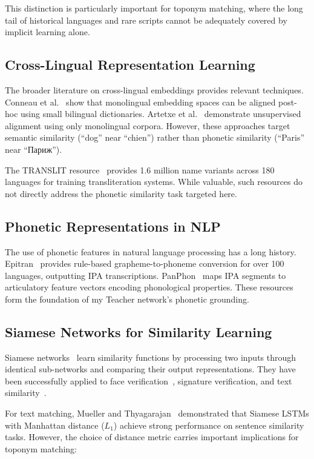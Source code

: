 \documentclass[11pt,a4paper]{article}
\begin{document}
This distinction is particularly important for toponym matching, where the long tail of historical languages and rare scripts cannot be adequately covered by implicit learning alone.

\subsection{Cross-Lingual Representation Learning}

The broader literature on cross-lingual embeddings provides relevant techniques. Conneau et al.~\citep{conneau2018} show that monolingual embedding spaces can be aligned post-hoc using small bilingual dictionaries. Artetxe et al.~\citep{artetxe2018} demonstrate unsupervised alignment using only monolingual corpora. However, these approaches target semantic similarity (``dog'' near ``chien'') rather than phonetic similarity (``Paris'' near ``Париж'').

The TRANSLIT resource~\citep{translit2020} provides 1.6 million name variants across 180 languages for training transliteration systems. While valuable, such resources do not directly address the phonetic similarity task targeted here.

\subsection{Phonetic Representations in NLP}

The use of phonetic features in natural language processing has a long history. Epitran~\citep{mortensen2018} provides rule-based grapheme-to-phoneme conversion for over 100 languages, outputting IPA transcriptions. PanPhon~\citep{mortensen2016} maps IPA segments to articulatory feature vectors encoding phonological properties. These resources form the foundation of my Teacher network's phonetic grounding.

\subsection{Siamese Networks for Similarity Learning}

Siamese networks~\citep{bromley1993,chopra2005} learn similarity functions by processing two inputs through identical sub-networks and comparing their output representations. They have been successfully applied to face verification~\citep{schroff2015}, signature verification, and text similarity~\citep{mueller2016,neculoiu2016}.

For text matching, Mueller and Thyagarajan~\citep{mueller2016} demonstrated that Siamese LSTMs with Manhattan distance ($L_1$) achieve strong performance on sentence similarity tasks. However, the choice of distance metric carries important implications for toponym matching:
\end{document}

